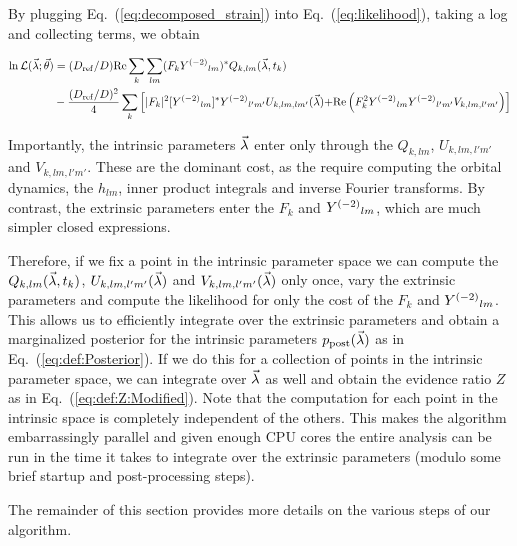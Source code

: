 By plugging Eq.~(\ref{eq:decomposed_strain}) into Eq.~(\ref{eq:likelihood}), taking a log and collecting terms, we obtain
\begin{widetext}
\begin{align}
\ln {\cal L}(\vec{\lambda}; \vec{\theta}) 
&= (D_{\rm ref}/D) \text{Re} \sum_k \sum_{lm}(F_k Y^{(-2)}{}_{lm})^* Q_{k,lm}(\vec{\lambda},t_k)\nonumber \\
&   -\frac{(D_{\rm ref}/D)^2}{4}\sum_k
\left[
{
|F_k|^2 [Y^{(-2)}{}_{lm}]^*Y^{(-2)}{}_{l'm'} U_{k,lm,lm'}(\vec{\lambda})
}
 {
+  \text{Re} \left( F_k^2 Y^{(-2)}{}_{lm} Y^{(-2)}{}_{l'm'} V_{k,lm,l'm'} \right)
}
\right]
\label{eq:def:lnL:Decomposed}
\end{align}
\end{widetext}
Importantly, the intrinsic parameters $\vec{\lambda}$ enter only through the $Q_{k,lm}$, $U_{k,lm,l'm'}$ and $V_{k,lm,l'm'}$.
These are the dominant cost, as the require computing the orbital dynamics, the $h_{lm}$, inner product integrals
and inverse Fourier transforms. By contrast, the extrinsic parameters enter the $F_k$ and $Y^{(-2)}{}_{lm}$,
which are much simpler closed expressions.

Therefore, if we fix a point in the intrinsic parameter space we can compute the
$Q_{k,lm}(\vec{\lambda},t_k)$, $U_{k,lm,l'm'}(\vec{\lambda})$ and $V_{k,lm,l'm'}(\vec{\lambda})$ only once,
vary the extrinsic parameters and compute the likelihood for only the cost of the $F_k$ and $Y^{(-2)}{}_{lm}$.
This allows us to efficiently integrate over the extrinsic parameters and obtain a marginalized posterior 
for the intrinsic parameters $p_{\rm post}(\vec{\lambda})$ as in Eq.~(\ref{eq:def:Posterior}).
If we do this for a collection of points in the intrinsic parameter space, we can integrate over $\vec{\lambda}$ as
well and obtain the evidence ratio $Z$ as in Eq.~(\ref{eq:def:Z:Modified}).
Note that the computation for each point in the intrinsic space is completely independent of the others.
This makes the algorithm embarrassingly parallel and given enough CPU cores the entire analysis can be
run in the time it takes to integrate over the extrinsic parameters (modulo some brief startup and post-processing steps).

The remainder of this section provides more details on the various steps of our algorithm.


